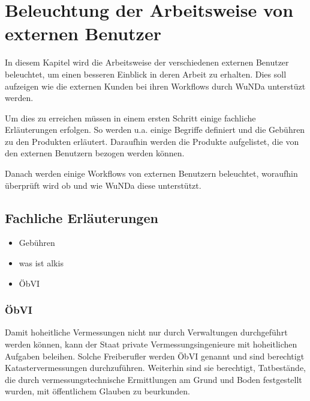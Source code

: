 \chapter{Beleuchtung der Arbeitsweise von externen Benutzer}

In diesem Kapitel wird die Arbeitsweise der verschiedenen externen Benutzer beleuchtet, um einen besseren Einblick in deren Arbeit zu erhalten.
Dies soll aufzeigen wie die externen Kunden bei ihren Workflows durch \ac{WuNDa} unterstüzt werden.

Um dies zu erreichen müssen in einem ersten Schritt einige fachliche Erläuterungen erfolgen. So werden u.a. einige Begriffe definiert und die Gebühren zu den Produkten erläutert. Daraufhin  werden die Produkte aufgelistet, die von den externen Benutzern bezogen werden können.

Danach werden einige Workflows von externen Benutzern beleuchtet, woraufhin überprüft wird ob und wie \ac{WuNDa} diese unterstützt.


\section{Fachliche Erläuterungen}
\begin{itemize}
\item Gebühren
\item was ist alkis
\item ÖbVI
\end{itemize}

\subsection{ÖbVI}
Damit hoheitliche Vermessungen nicht nur durch Verwaltungen durchgeführt werden können, kann der Staat private Vermessungsingenieure mit hoheitlichen Aufgaben beleihen. Solche Freiberufler werden \acf{ÖbVI} genannt und sind berechtigt Katastervermessungen durchzuführen. Weiterhin sind sie berechtigt, Tatbestände, die durch vermessungstechnische Ermittlungen am Grund und Boden festgestellt wurden, mit öffentlichem Glauben zu beurkunden. \autocite[vgl.][]{bdvi-oebvi} 


